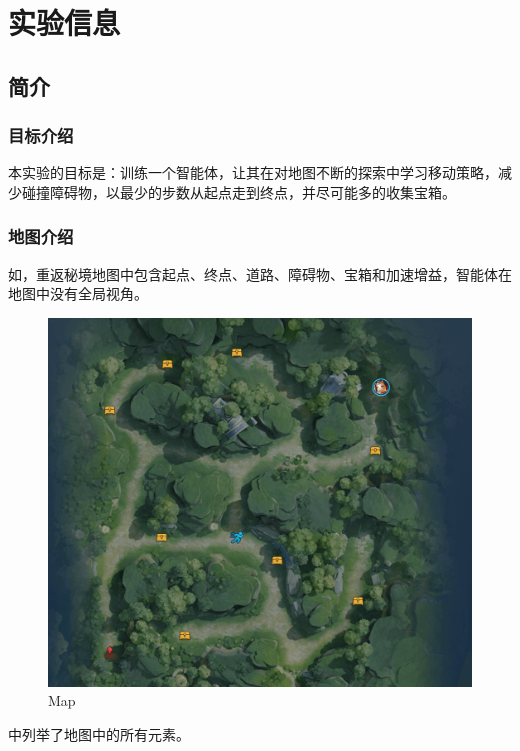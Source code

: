 \section{实验信息}

\subsection{简介}

\subsubsection{目标介绍}
本实验的目标是：训练一个智能体，让其在对地图不断的探索中学习移动策略，减少碰撞障碍物，以最少的步数从起点走到终点，并尽可能多的收集宝箱。
\subsubsection{地图介绍}

如，重返秘境地图中包含起点、终点、道路、障碍物、宝箱和加速增益，智能体在地图中没有全局视角。

\begin{figure}[H]
    \centering
    \includegraphics[width=0.8\linewidth]{pic/map.png}
    \caption{ Map}
    \label{map}
\end{figure}

 中列举了地图中的所有元素。

